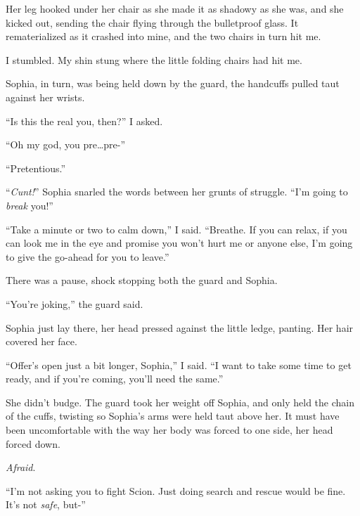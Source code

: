 Her leg hooked under her chair as she made it as shadowy as she was, and she kicked out, sending the chair flying through the bulletproof glass.  It rematerialized as it crashed into mine, and the two chairs in turn hit me.



I stumbled.  My shin stung where the little folding chairs had hit me.



Sophia, in turn, was being held down by the guard, the handcuffs pulled taut against her wrists.



``Is this the real you, then?'' I asked.



``Oh my god, you pre\ldots pre-''



``Pretentious.''



``\emph{Cunt!}''  Sophia snarled the words between her grunts of struggle.  ``I'm going to \emph{break} you!''



``Take a minute or two to calm down,'' I said.  ``Breathe.  If you can relax, if you can look me in the eye and promise you won't hurt me or anyone else, I'm going to give the go-ahead for you to leave.''



There was a pause, shock stopping both the guard and Sophia.



``You're joking,'' the guard said.



Sophia just lay there, her head pressed against the little ledge, panting.  Her hair covered her face.



``Offer's open just a bit longer, Sophia,'' I said.  ``I want to take some time to get ready, and if you're coming, you'll need the same.''



She didn't budge.  The guard took her weight off Sophia, and only held the chain of the cuffs, twisting so Sophia's arms were held taut above her.  It must have been uncomfortable with the way her body was forced to one side, her head forced down.



\emph{Afraid}.



``I'm not asking you to fight Scion.  Just doing search and rescue would be fine.  It's not \emph{safe}, but-''




